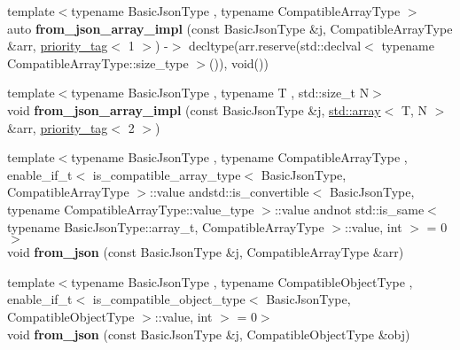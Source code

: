 \begin{DoxyCompactItemize}
\item 
{\footnotesize template$<$typename Basic\+Json\+Type , typename Compatible\+Array\+Type $>$ }\\auto {\bfseries from\+\_\+json\+\_\+array\+\_\+impl} (const Basic\+Json\+Type \&j, Compatible\+Array\+Type \&arr, \hyperlink{structnlohmann_1_1detail_1_1priority__tag}{priority\+\_\+tag}$<$ 1 $>$) -\/$>$ decltype(arr.\+reserve(std\+::declval$<$ typename Compatible\+Array\+Type\+::size\+\_\+type $>$()), void())\hypertarget{namespacenlohmann_1_1detail_a57f93ed57254a1639087cdc316e0fb83}{}\label{namespacenlohmann_1_1detail_a57f93ed57254a1639087cdc316e0fb83}

\item 
{\footnotesize template$<$typename Basic\+Json\+Type , typename T , std\+::size\+\_\+t N$>$ }\\void {\bfseries from\+\_\+json\+\_\+array\+\_\+impl} (const Basic\+Json\+Type \&j, \hyperlink{namespacenlohmann_1_1detail_a90aa5ef615aa8305e9ea20d8a947980faf1f713c9e000f5d3f280adbd124df4f5}{std\+::array}$<$ T, N $>$ \&arr, \hyperlink{structnlohmann_1_1detail_1_1priority__tag}{priority\+\_\+tag}$<$ 2 $>$)\hypertarget{namespacenlohmann_1_1detail_a46b0781205d0bdc5a959343b389966a4}{}\label{namespacenlohmann_1_1detail_a46b0781205d0bdc5a959343b389966a4}

\item 
{\footnotesize template$<$typename Basic\+Json\+Type , typename Compatible\+Array\+Type , enable\+\_\+if\+\_\+t$<$ is\+\_\+compatible\+\_\+array\+\_\+type$<$ Basic\+Json\+Type, Compatible\+Array\+Type $>$\+::value andstd\+::is\+\_\+convertible$<$ Basic\+Json\+Type, typename Compatible\+Array\+Type\+::value\+\_\+type $>$\+::value andnot std\+::is\+\_\+same$<$ typename Basic\+Json\+Type\+::array\+\_\+t, Compatible\+Array\+Type $>$\+::value, int $>$  = 0$>$ }\\void {\bfseries from\+\_\+json} (const Basic\+Json\+Type \&j, Compatible\+Array\+Type \&arr)\hypertarget{namespacenlohmann_1_1detail_a8dcac00852dbe1f61d1e78135b19d428}{}\label{namespacenlohmann_1_1detail_a8dcac00852dbe1f61d1e78135b19d428}

\item 
{\footnotesize template$<$typename Basic\+Json\+Type , typename Compatible\+Object\+Type , enable\+\_\+if\+\_\+t$<$ is\+\_\+compatible\+\_\+object\+\_\+type$<$ Basic\+Json\+Type, Compatible\+Object\+Type $>$\+::value, int $>$  = 0$>$ }\\void {\bfseries from\+\_\+json} (const Basic\+Json\+Type \&j, Compatible\+Object\+Type \&obj)\hypertarget{namespacenlohmann_1_1detail_a5e7a3674e8ac46f8feebad9712d7c55f}{}\label{namespacenlohmann_1_1detail_a5e7a3674e8ac46f8feebad9712d7c55f}


\end{DoxyCompactItemize}
